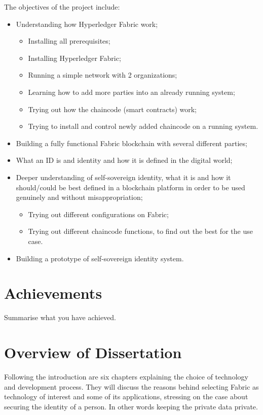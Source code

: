 \documentclass[a4paper,11pt]{report}
\begin{document}
The objectives of the project include:  
\begin{itemize}
\item Understanding how Hyperledger Fabric work;
	\begin{itemize}
	\item Installing all prerequisites;
	\item Installing Hyperledger Fabric; 
	\item Running a simple network with 2 organizations; 
	\item Learning how to add more parties into an already running system;
	\item Trying out how the chaincode (smart contracts) work;
	\item Trying to install and control newly added chaincode on a running system.
	\end{itemize}
\item Building a fully functional Fabric blockchain with several different parties;
\item What an ID is  and identity and how it is defined in the digital world;
\item Deeper understanding of self-sovereign identity, what it is and how it should/could be best defined in a blockchain platform in order to be used genuinely and without misappropriation;
	\begin{itemize}
	\item Trying out different configurations on Fabric;
	\item Trying out different chaincode functions, to find out the best for the use case.
	\end{itemize}
\item Building a prototype of self-sovereign identity system.

\end{itemize}



\section{Achievements}

\label{introduction-achievements}

Summarise what you have achieved.

\section{Overview of Dissertation}

Following the introduction are six chapters explaining the choice of technology and development process. They will discuss the reasons behind selecting Fabric as technology of interest and some of its applications, stressing on the case about securing the identity of a person. In other words keeping the private data private. 
\end{document}
